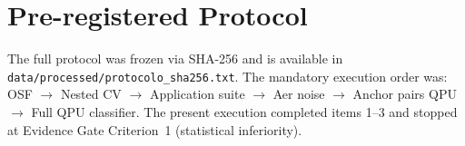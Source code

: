 \documentclass[11pt,a4paper]{article}
\begin{document}
\section{Pre-registered Protocol}
\label{app:protocol}

The full protocol was frozen via SHA-256 and is available in
\texttt{data/processed/protocolo\_sha256.txt}. The mandatory execution order
was: OSF $\to$ Nested CV $\to$ Application suite $\to$ Aer noise $\to$
Anchor pairs QPU $\to$ Full QPU classifier. The present execution completed
items 1--3 and stopped at Evidence Gate Criterion~1 (statistical inferiority).
\end{document}
